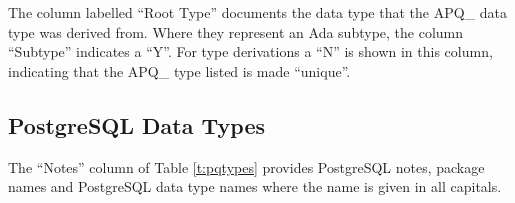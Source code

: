 \documentclass[english,letterpaper]{book}
\begin{document}
The column labelled ``Root Type'' documents the data type that
the APQ\_ data type was derived from. Where they represent an Ada
subtype, the column ``Subtype'' indicates a ``Y''. For type
derivations a ``N'' is shown in this column, indicating that the
APQ\_ type  listed is made ``unique''.


\subsection{PostgreSQL Data Types\label{PostgreSQL SQL Data Types}}

The ``Notes'' column of Table \ref{t:pqtypes} provides PostgreSQL notes, package names and
PostgreSQL data type names where the name is given in all capitals.
\end{document}
